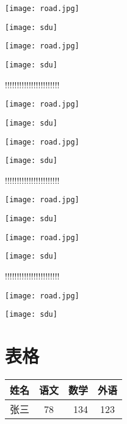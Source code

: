 \documentclass{article} %
\begin{document}
	
	
	\texttt{[image: road.jpg]}
	
	\texttt{[image: sdu]}
	
	
	
	\texttt{[image: road.jpg]}
	
	\texttt{[image: sdu]}
	
	!!!!!!!!!!!!!!!!!!!!!!!
	
	\texttt{[image: road.jpg]}
	
	\texttt{[image: sdu]}

	\texttt{[image: road.jpg]}
	
	\texttt{[image: sdu]}	
	
	
	!!!!!!!!!!!!!!!!!!!!!!!
	
	\texttt{[image: road.jpg]}
	
	\texttt{[image: sdu]}

	\texttt{[image: road.jpg]}
	
	\texttt{[image: sdu]}	
	
	
	!!!!!!!!!!!!!!!!!!!!!!!
	
	
	
	\texttt{[image: road.jpg]}
	
	\texttt{[image: sdu]}	
	
	
	
	
	
	\section{表格}
	
	
	\begin{tabular}{|l|c|r|c|} %
		\hline %
		姓名 & 语文 & 数学 & 外语 \\ %
		\hline
		张三 & 78 & 134 & 123 \\
		\hline
	\end{tabular}
\end{document}
